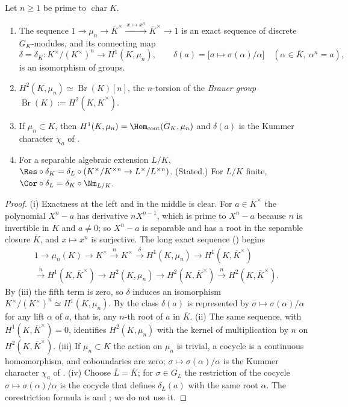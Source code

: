 \begin{theorem}\label{thm:galcoh:kummer}
Let $n\ge1$ be prime to $\operatorname{char}K$.
\begin{enumerate}[label=(\roman*)]
\item The sequence $1\to\mu_n\to\overline K^\times\xrightarrow{\ x\mapsto x^n\ }\overline K^\times\to1$ is an exact sequence of discrete $G_K$-modules, and its connecting map
\[
\delta=\delta_K\colon K^\times/(K^\times)^n\longrightarrow H^1(K,\mu_n),\qquad\delta(a)=\bigl[\sigma\mapsto\sigma(\alpha)/\alpha\bigr]\quad(\alpha\in\overline K,\ \alpha^n=a),
\]
is an isomorphism of groups.
\item $H^2(K,\mu_n)\simeq\operatorname{Br}(K)[n]$, the $n$-torsion of the \emph{Brauer group} $\operatorname{Br}(K):=H^2(K,\overline K^\times)$.
\item If $\mu_n\subset K$, then $H^1(K,\mu_n)=\Hom_{\mathrm{cont}}(G_K,\mu_n)$ and $\delta(a)$ is the Kummer character $\chi_a$ of .
\item For a separable algebraic extension $L/K$, $\Res\circ\delta_K=\delta_L\circ(K^\times/K^{\times n}\to L^\times/L^{\times n})$. (Stated.) For $L/K$ finite,
$\Cor\circ\delta_L=\delta_K\circ\Nm_{L/K}$.
\end{enumerate}
\end{theorem}

\begin{proof}
(i) Exactness at the left and in the middle is clear. For $a\in\overline K^\times$ the polynomial $X^n-a$ has derivative $nX^{n-1}$, which is prime to $X^n-a$ because $n$
is invertible in $K$ and $a\ne0$; so $X^n-a$ is separable and has a root in the separable closure $\overline K$, and $x\mapsto x^n$ is surjective. The long exact sequence
() begins
\begin{multline*}
1\to\mu_n(K)\to K^\times\xrightarrow{\ n\ }K^\times\xrightarrow{\ \delta\ }H^1(K,\mu_n)\to H^1(K,\overline K^\times)\\
\xrightarrow{\ n\ }H^1(K,\overline K^\times)\to H^2(K,\mu_n)\to H^2(K,\overline K^\times)\xrightarrow{\ n\ }H^2(K,\overline K^\times).
\end{multline*}
By (iii) the fifth term is zero, so $\delta$ induces an isomorphism $K^\times/(K^\times)^n\simeq H^1(K,\mu_n)$. By
 the class $\delta(a)$ is represented by $\sigma\mapsto\sigma(\alpha)/\alpha$ for any lift $\alpha$ of $a$, that is, any $n$-th root of $a$ in
$\overline K$. (ii) The same sequence, with $H^1(K,\overline K^\times)=0$, identifies $H^2(K,\mu_n)$ with the kernel of multiplication by $n$ on $H^2(K,\overline K^\times)$.
(iii) If $\mu_n\subset K$ the action on $\mu_n$ is trivial, a cocycle is a continuous homomorphism, and coboundaries are zero; $\sigma\mapsto\sigma(\alpha)/\alpha$ is
the Kummer character $\chi_a$ of . (iv) Choose $\overline L=\overline K$; for $\sigma\in G_L$ the restriction of the cocycle $\sigma\mapsto\sigma(\alpha)/\alpha$
is the cocycle that defines $\delta_L(a)$ with the same root $\alpha$. The corestriction formula is \cite[Chapter XIV, Section 1]{SerreLocalFields} and
\cite[Chapter VI, Section 2]{NSW}; we do not use it.
\end{proof}

